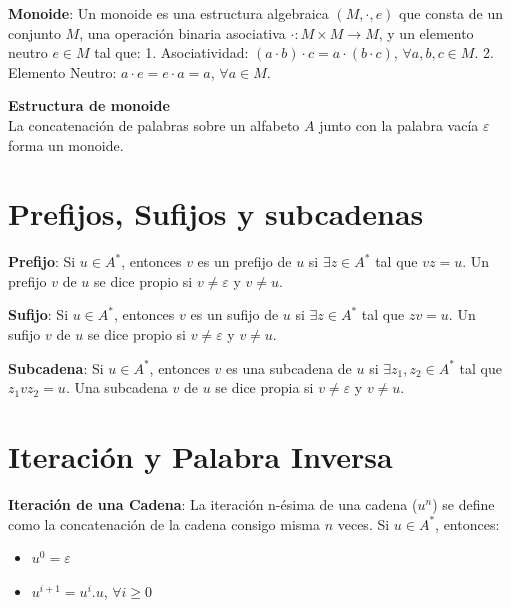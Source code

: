 \documentclass[12pt]{report} %
\begin{document}
\begin{definicion}
\textbf{Monoide}: Un monoide es una estructura algebraica $(M, \cdot, e)$ que consta de un conjunto $M$, una operación binaria asociativa $\cdot : M \times M \to M$, y un elemento neutro $e \in M$ tal que:  
1. Asociatividad: $(a \cdot b) \cdot c = a \cdot (b \cdot c)$, $\forall a, b, c \in M$.  
2. Elemento Neutro: $a \cdot e = e \cdot a = a$, $\forall a \in M$.  
\end{definicion}

\textbf{Estructura de monoide}\\
La concatenación de palabras sobre un alfabeto \(A\) junto con la
palabra vacía \(\varepsilon\) forma un monoide.

\hypertarget{prefijos-sufijos-y-subcadenas}{%
\section{Prefijos, Sufijos y
subcadenas}\label{prefijos-sufijos-y-subcadenas}}

\begin{definicion}
\textbf{Prefijo}: Si $u \in A^*$, entonces $v$ es un prefijo de $u$ si $\exists z \in A^*$ tal que $vz = u$.  
Un prefijo $v$ de $u$ se dice propio si $v \neq \varepsilon$ y $v \neq u$.  
\end{definicion}

\begin{definicion}
\textbf{Sufijo}: Si $u \in A^*$, entonces $v$ es un sufijo de $u$ si $\exists z \in A^*$ tal que $zv = u$.  
Un sufijo $v$ de $u$ se dice propio si $v \neq \varepsilon$ y $v \neq u$.  
\end{definicion}

\begin{definicion}
\textbf{Subcadena}: Si $u \in A^*$, entonces $v$ es una subcadena de $u$ si $\exists z_1, z_2 \in A^*$ tal que $z_1vz_2 = u$.  
Una subcadena $v$ de $u$ se dice propia si $v \neq \varepsilon$ y $v \neq u$.  
\end{definicion}

\hypertarget{iteraciuxf3n-y-palabra-inversa}{%
\section{Iteración y Palabra
Inversa}\label{iteraciuxf3n-y-palabra-inversa}}

\begin{definicion}
\textbf{Iteración de una Cadena}: La iteración n-ésima de una cadena ($u^n$) se define como la concatenación de la cadena consigo misma $n$ veces.  
Si $u \in A^*$, entonces:  
\begin{itemize}
    \item $u^0 = \varepsilon$  
    \item $u^{i+1} = u^i.u$, $\forall i \geq 0$  
\end{itemize}
\end{definicion}
\end{document}
